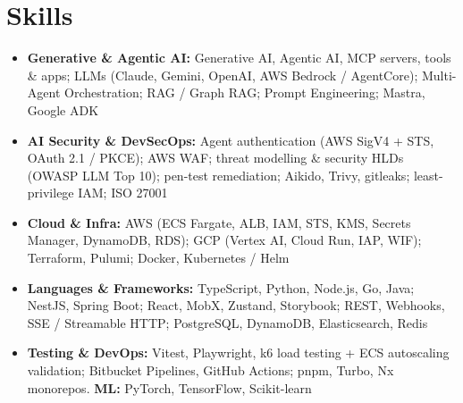 \documentclass[11pt,a4paper,sans]{moderncv}
\begin{document}
\section{Skills}
{\begin{itemize}[label=\textbullet, itemsep=1pt]
\item {\textbf{Generative \& Agentic AI:} Generative AI, Agentic AI, MCP servers, tools \& apps; LLMs (Claude, Gemini, OpenAI, AWS Bedrock / AgentCore); Multi-Agent Orchestration; RAG / Graph RAG; Prompt Engineering; Mastra, Google ADK}
\item {\textbf{AI Security \& DevSecOps:} Agent authentication (AWS SigV4 + STS, OAuth 2.1 / PKCE); AWS WAF; threat modelling \& security HLDs (OWASP LLM Top 10); pen-test remediation; Aikido, Trivy, gitleaks; least-privilege IAM; ISO 27001}
\item {\textbf{Cloud \& Infra:} AWS (ECS Fargate, ALB, IAM, STS, KMS, Secrets Manager, DynamoDB, RDS); GCP (Vertex AI, Cloud Run, IAP, WIF); Terraform, Pulumi; Docker, Kubernetes / Helm}
\item {\textbf{Languages \& Frameworks:} TypeScript, Python, Node.js, Go, Java; NestJS, Spring Boot; React, MobX, Zustand, Storybook; REST, Webhooks, SSE / Streamable HTTP; PostgreSQL, DynamoDB, Elasticsearch, Redis}
\item {\textbf{Testing \& DevOps:} Vitest, Playwright, k6 load testing + ECS autoscaling validation; Bitbucket Pipelines, GitHub Actions; pnpm, Turbo, Nx monorepos. \textbf{ML:} PyTorch, TensorFlow, Scikit-learn}
\end{itemize}}
\end{document}
